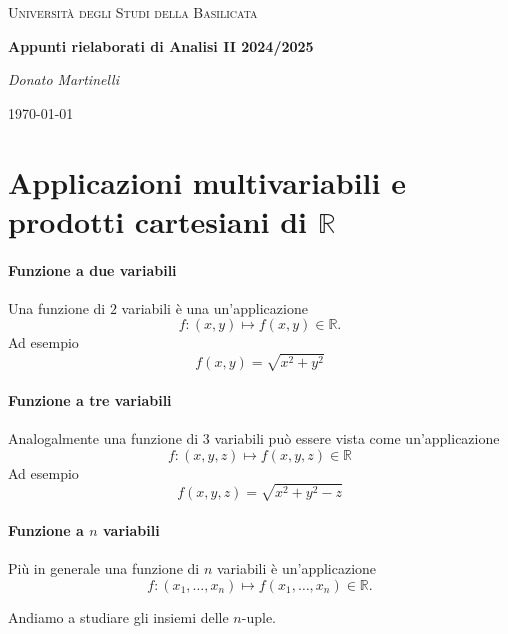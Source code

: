 \documentclass{article}
\theoremstyle{plain}
\theoremstyle{definition}
\theoremstyle{remark}
\begin{document}
\begin{titlepage}
    \centering
	{\textsc{Università degli Studi della Basilicata} \par}
	\vspace{2cm}
    {\huge\bfseries Appunti rielaborati di Analisi II 2024/2025\par}
    \vfill
	{\Large\itshape Donato Martinelli\par}
	{\large \today\par}
\end{titlepage}
\tableofcontents

\newpage 

\section{Applicazioni multivariabili e prodotti cartesiani di $\mathbb{R}$}

\vspace{10pt}

\paragraph{Funzione a due variabili}
Una funzione di $2$ variabili è una un'applicazione \[f:(x,y)\mapsto f(x,y)\in\mathbb{R}.\]
Ad esempio
\[f(x,y)=\sqrt{x^2+y^2}\]

\vspace{10pt}

\paragraph{Funzione a tre variabili}
Analogalmente una funzione di 3 variabili può essere vista come un'applicazione 
\[f:(x,y,z)\mapsto f(x,y,z)\in\mathbb{R}\]
Ad esempio
\[f(x,y,z)=\sqrt{x^2+y^2-z}\]

\vspace{10pt}

\paragraph{Funzione a $n$ variabili}
Più in generale una funzione di $n$ variabili è un'applicazione 
\[f:(x_1,\ldots,x_n)\mapsto f(x_1,\ldots,x_n)\in\mathbb{R}.\]

\vspace{10pt}

Andiamo a studiare gli insiemi delle $n$-uple.

\vspace{10pt}
\end{document}

